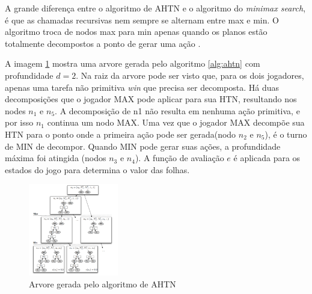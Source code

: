A grande diferença entre o algoritmo de AHTN e o algoritmo do \textit{minimax search}, é que as chamadas recursivas nem sempre se alternam entre max e min. O algoritmo troca de nodos max para min apenas quando os planos estão totalmente decompostos a ponto de gerar uma ação \cite{ontanon2015adversarial}.


A imagem \ref{fig:ahtn} mostra uma arvore gerada pelo algoritmo \ref{alg:ahtn} com profundidade $d = 2$. Na raiz da arvore pode ser visto que, para os dois jogadores, apenas uma tarefa não primitiva \textit{win} que precisa ser decomposta. Há duas decomposições que o jogador MAX pode aplicar para sua HTN, resultando nos nodes $n_{1}$ e $n_{5}$. A decomposição de n1 não resulta em nenhuma ação primitiva, e por isso $n_{1}$ continua um nodo MAX. Uma vez que o jogador MAX decompõe sua HTN para o ponto onde a primeira ação pode ser gerada(nodo $n_{2}$ e $n_{5}$), é o turno de MIN de decompor. Quando MIN pode gerar suas ações, a profundidade máxima foi atingida (nodos $n_{3}$ e $n_{4}$). A função de avaliação $e$ é aplicada para os estados do jogo para determina o valor das folhas.

\begin{figure}[ht]
	\centering
	\includegraphics[width=0.35\textwidth]{fig/ahtn.pdf}
	\caption{Arvore gerada pelo algoritmo de AHTN}
	\label{fig:ahtn}
\end{figure} 